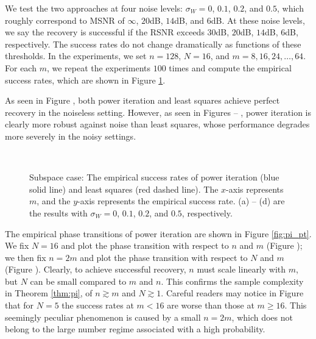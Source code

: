 \documentclass[11pt,journal]{IEEEtran}
\begin{document}
We test the two approaches at four noise levels: $\sigma_W=0$, $0.1$, $0.2$, and $0.5$, which roughly correspond to MSNR of $\infty$, $20$dB, $14$dB, and $6$dB. At these noise levels, we say the recovery is successful if the RSNR exceeds $30$dB, $20$dB, $14$dB, $6$dB, respectively. The success rates do not change dramatically as functions of these thresholds.
In the experiments, we set $n=128$, $N=16$, and $m= 8, 16, 24, \dots, 64$. For each $m$, we repeat the experiments $100$ times and compute the empirical success rates, which are shown in Figure \ref{fig:subspace}.

As seen in Figure , both power iteration and least squares achieve perfect recovery in the noiseless setting. However, as seen in Figures  --  , power iteration is clearly more robust against noise than least squares, whose performance degrades more severely in the noisy settings. 

\begin{figure}[htbp]%
\centering
\subfloat[]{
\label{fig:subspace_a}}
\subfloat[]{
\label{fig:subspace_b}}
\\
\subfloat[]{
\label{fig:subspace_c}}
\subfloat[]{
\label{fig:subspace_d}}
\caption{Subspace case: The empirical success rates of power iteration (blue solid line) and least squares (red dashed line). The $x$-axis represents $m$, and the $y$-axis represents the empirical success rate. (a) -- (d) are the results with $\sigma_W=0$, $0.1$, $0.2$, and $0.5$, respectively.}%
\label{fig:subspace}%
\end{figure}

The empirical phase transitions of power iteration are shown in Figure \ref{fig:pi_pt}. We fix $N=16$ and plot the phase transition with respect to $n$ and $m$ (Figure ); we then fix $n=2m$ and plot the phase transition with respect to $N$ and $m$ (Figure ). Clearly, to achieve successful recovery, $n$ must scale linearly with $m$, but $N$ can be small compared to $m$ and $n$. This confirms the sample complexity in Theorem \ref{thm:pi}, of $n\gtrsim m$ and $N\gtrsim 1$. Careful readers may notice in Figure  that for $N = 5$ the success rates at $m < 16$ are worse than those at $m \geq 16$. This seemingly peculiar phenomenon is caused by a small $n = 2m$, which does not belong to the large number regime associated with a high probability.
\end{document}
